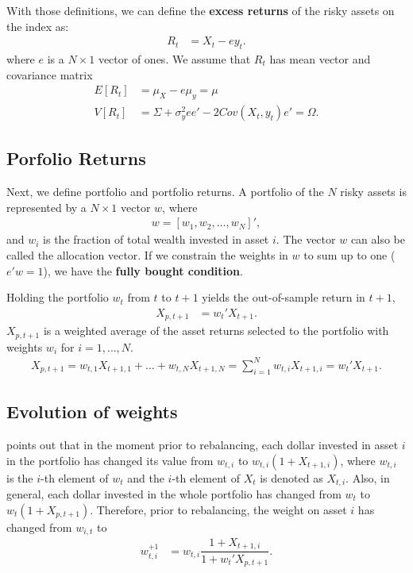 \documentclass[preprint, doubleblind, authoryear,10pt]{elsarticle}
\begin{document}
With those definitions, we can define the \textbf{excess returns} of the risky assets on the index as:
\begin{align*}
	R_{t} &= X_{t} - e y_{t}.
\end{align*}
where $e$ is a $N \times 1$ vector of ones.
We assume that $R_{t}$ has mean vector and covariance matrix 
\begin{align*}
E[R_{t}] &= \mu_{X}-e\mu_{y}=\mu
\\
V[R_{t}] &= \Sigma + \sigma_{y}^{2}ee' - 2Cov(X_{t},y_{t})e' =\Omega.
\end{align*}


\subsection*{Porfolio Returns}

Next, we define portfolio and portfolio returns.
A portfolio of the $N$ risky assets is represented by a $N\times 1$ vector $w$, where
\begin{align*}
	w = \left[ w_1, w_2 , \dots, w_N \right]',
\end{align*}
and $w_{i}$ is the fraction of total wealth invested in asset $i$.
The vector $w$ can also be called the allocation vector.
If we constrain the weights in $w$ to sum up to one ($e'w=1$), we have the \textbf{fully bought condition}.

Holding the portfolio $w_{t}$ from $t$ to $t+1$ yields the out-of-sample return in $t+1$,
\begin{align} \label{eq:retport}
	X_{p,t+1} &= w_{t}'X_{t+1}.
\end{align}
$X_{p,t+1}$ is a weighted average of the asset returns selected to the portfolio with weights $w_{i}$ for $i=1,\dots,N$.
\begin{align*} \label{ret_port}
	X_{p,t+1} = w_{t,1} X_{t+1,1} + \dots + w_{t,N} X_{t+1,N}
	= \sum_{i=1}^{N} w_{t,i} X_{t+1,i} = w_{t}'X_{t+1}.
\end{align*}

\subsection*{Evolution of weights}

\cite{liu-2009} points out that in the moment prior to rebalancing, each dollar invested in asset $i$ in the portfolio has changed its value from $w_{t,i}$ to $w_{t,i}(1+X_{t+1,i})$, where $w_{t,i}$ is the $i$-th element of $w_{t}$ and the $i$-th element of $X_{t}$ is denoted as $X_{t,i}$.
Also, in general, each dollar invested in the whole portfolio has changed from $w_{t}$ to $w_{t}(1+X_{p,t+1})$.
Therefore, prior to rebalancing, the weight on asset $i$ has changed from $w_{i,t}$ to 
\begin{align*}
	w_{t,i}^{+1} &= w_{t,i} \dfrac{1+X_{t+1,i}}{1+w_{t}'X_{p,t+1}}.
\end{align*}
\end{document}
